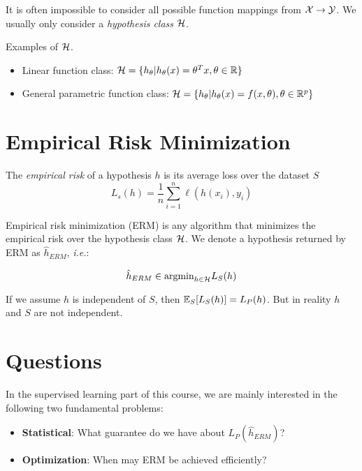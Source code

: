 
It is often impossible to consider all possible function mappings from \(\mathcal{X} \to \mathcal{Y}\). We 
usually only consider a \emph{hypothesis class} \(\mathcal{H}\).  

\begin{eg}
    Examples of \(\mathcal{H}\). 
    \begin{itemize}
        \item Linear function class: \(\mathcal{H} = \{h_\theta | h_\theta (x) = \theta^T x, \theta \in \mathbb{R}\}\) 
        \item General parametric function class: \(\mathcal{H} = \{h_\theta | h_\theta (x) = f(x,\theta), \theta \in \mathbb{R}^p\}\)
    \end{itemize}
\end{eg}


\section{Empirical Risk Minimization}

\begin{definition}\label{def:erm}
    The \emph{empirical risk} of a hypothesis \(h\) is its average loss over the dataset \(S\)
    \[
        L_{s}(h) = \frac{1}{n} \sum_{i=1}^n \ell (h(x_i), y_i)    
    \]
\end{definition}

Empirical risk minimization (ERM) is any algorithm that minimizes the empirical risk over the hypothesis 
class \(\mathcal{H}\). We denote a hypothesis returned by ERM as \(\hat{h}_{ERM}\), \emph{i.e.}: 

\[
    \hat{h}_{ERM} \in \text{argmin}_{h\in \mathcal{H}} L_S (h)    
\]

If we assume \(h\) is independent of \(S\), then \(\mathbb{E}_S[L_S(h)] = L_P(h)\). But in reality 
\(h\) and \(S\) are not independent. 


\section{Questions} 

In the supervised learning part of this course, we are mainly interested in the following two 
fundamental problems: 

\begin{itemize}
    \item \textbf{Statistical}: What guarantee do we have about \(L_P(\hat{h}_{ERM})\)? 
    \item \textbf{Optimization}: When may ERM be achieved efficiently? 
\end{itemize}



